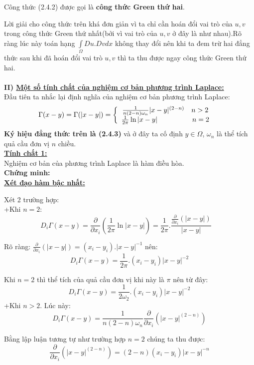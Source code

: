 Công thức (2.4.2) được gọi là \textbf{công thức Green thứ hai}.

Lời giải cho công thức trên khá đơn giản vì ta chỉ cần hoán đổi vai trò của $u,v$ trong công thức Green thứ nhất(bởi vì vai trò của $u,v$ ở đây là như nhau).Rõ ràng lúc này toán hạng $
{\int\limits_\Omega  {Du.Dvdx} }$ không thay đổi nên khi ta đem trừ hai đẳng thức sau khi đã hoán đổi vai trò $u,v$ thì ta thu được ngay công thức Green thứ hai.
\\
\\
\textbf{II) \underline{Một số tính chất của nghiệm cơ bản phương trình Laplace:}}\\
Đầu tiên ta nhắc lại định nghĩa của nghiệm cơ bản phương trình Laplace:
\[
\Gamma (x - y) = \Gamma (|x - y|) = \left\{ {\begin{array}{*{20}c}
   {\frac{1}
{{n(2 - n)\omega _n }}|x - y|^{(2 - n)} \quad n > 2}  \\
   {\frac{1}
{{2\pi }}\ln |x - y|\quad \quad \quad \quad \quad n = 2}  \\

 \end{array} } \right.\quad 
\]  
\textbf{Ký hiệu đẳng thức trên là (2.4.3)} và ở đây ta cố định $y \in \Omega$, $\omega_{n}$ là thể tích quả cầu đơn vị $n$ chiều.
\\
\textbf{\underline{Tính chất 1:}}
\\
Nghiệm cơ bản của phương trình Laplace là hàm điều hòa.\\
\textbf{Chứng minh:}
\\
\textbf{\underline{Xét đạo hàm bậc nhất:}}

	Xét 2 trường hợp:\\
		+Khi $n=2$:
\[
D_i \Gamma (x - y) = \frac{\partial }
{{\partial x_i }}(\frac{1}
{{2\pi }}\ln |x - y|) = \frac{1}
{{2\pi }}.\frac{{\frac{\partial }
{{\partial x_i }}(|x - y|)}}
{{|x - y|}}\quad 
\]

Rõ ràng: $
\frac{\partial }
{{\partial x_i }}(|x - y|) = (x_i  - y_i ).|x - y|^{ - 1} 
$ nên:
\[
D_i \Gamma (x - y) = \frac{1}
{{2\pi }}.(x_i  - y_i )|x - y|^{ - 2} 
\]

Khi $n=2$ thì thể tích của quả cầu đơn vị khi này là $\pi$ nên từ đây:
\[
D_i \Gamma (x - y) = \frac{1}
{{2\omega _2 }}.(x_i  - y_i )|x - y|^{ - 2} 
\]
+Khi $n>2$. Lúc này:
\[
D_i \Gamma (x - y) = \frac{1}
{{n(2 - n)\omega _n }}\frac{\partial }
{{\partial x_i }}(|x - y|^{(2 - n)} )
\]

Bằng lập luận tương tự như trường hợp $n=2$ chúng ta thu được:
\[
\frac{\partial }
{{\partial x_i }}(|x - y|^{(2 - n)} ) = (2 - n)(x_i  - y_i )|x - y|^{ - n} 
\]

